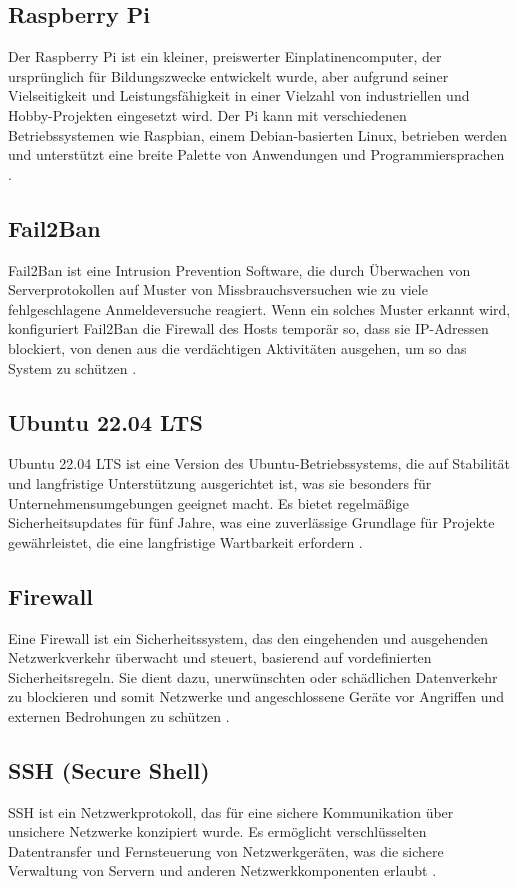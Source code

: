 \subsection{Raspberry Pi}
\label{subsec:pi}
Der Raspberry Pi ist ein kleiner, preiswerter Einplatinencomputer, der ursprünglich für Bildungszwecke entwickelt wurde, aber aufgrund seiner Vielseitigkeit und Leistungsfähigkeit in einer Vielzahl von industriellen und Hobby-Projekten eingesetzt wird. Der Pi kann mit verschiedenen Betriebssystemen wie Raspbian, einem Debian-basierten Linux, betrieben werden und unterstützt eine breite Palette von Anwendungen und Programmiersprachen \cite{Raspberry}.

\subsection{Fail2Ban}
\label{subsec:f2b}
Fail2Ban ist eine Intrusion Prevention Software, die durch Überwachen von Serverprotokollen auf Muster von Missbrauchsversuchen wie zu viele fehlgeschlagene Anmeldeversuche reagiert. Wenn ein solches Muster erkannt wird, konfiguriert Fail2Ban die Firewall des Hosts temporär so, dass sie IP-Adressen blockiert, von denen aus die verdächtigen Aktivitäten ausgehen, um so das System zu schützen \cite{Fail2ban}.

\subsection{Ubuntu 22.04 LTS}
\label{subsec:ubuntu}
Ubuntu 22.04 LTS ist eine Version des Ubuntu-Betriebssystems, die auf Stabilität und langfristige Unterstützung ausgerichtet ist, was sie besonders für Unternehmensumgebungen geeignet macht. Es bietet regelmäßige Sicherheitsupdates für fünf Jahre, was eine zuverlässige Grundlage für Projekte gewährleistet, die eine langfristige Wartbarkeit erfordern \cite{Ubuntu}.

\subsection{Firewall}
\label{subsec:firewall}
Eine Firewall ist ein Sicherheitssystem, das den eingehenden und ausgehenden Netzwerkverkehr überwacht und steuert, basierend auf vordefinierten Sicherheitsregeln. Sie dient dazu, unerwünschten oder schädlichen Datenverkehr zu blockieren und somit Netzwerke und angeschlossene Geräte vor Angriffen und externen Bedrohungen zu schützen \cite {Firewall}.

\subsection{SSH (Secure Shell)}
\label{subsec:ssh}
SSH ist ein Netzwerkprotokoll, das für eine sichere Kommunikation über unsichere Netzwerke konzipiert wurde. Es ermöglicht verschlüsselten Datentransfer und Fernsteuerung von Netzwerkgeräten, was die sichere Verwaltung von Servern und anderen Netzwerkkomponenten erlaubt \cite{SSH}.

